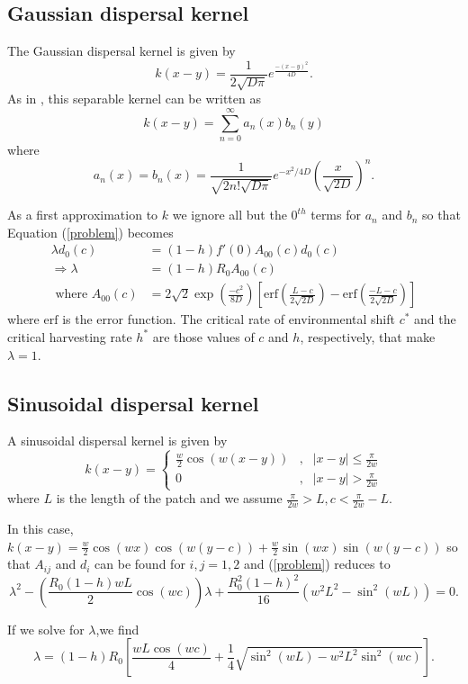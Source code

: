 \documentclass[12pt,english]{article}
\begin{document}
\subsection{Gaussian dispersal kernel \label{gausapp}}
The Gaussian dispersal kernel is given by
$$k(x-y)=\frac{1}{2\sqrt{D\pi}}e^{\frac{-(x-y)^2}{4D}}.$$
As in \citep{Latore:1998fk}, this separable kernel can be written as
$$k(x-y)=\sum_{n=0}^\infty a_n(x)b_n(y)$$
where
$$a_n(x)=b_n(x)=\frac{1}{\sqrt{2n!\sqrt{D\pi}}}e^{-x^2/4D}\left(\frac{x}{\sqrt{2D}}\right)^n.$$

As a first approximation to $k$ we ignore all but the $0^{th}$ terms for $a_n$ and $b_n$ so that Equation (\ref{problem}) becomes
\begin{align*}
\lambda d_0(c)&=(1-h)f'(0)A_{00}(c)d_0(c)
\\ \Rightarrow \lambda&=(1-h)R_0A_{00}(c)
\\\text{ where } A_{00}(c)&=2\sqrt{2}\exp\left(\frac{-c^2}{8D}\right)\left[\text{erf}\left(\frac{L-c}{2\sqrt{2D}}\right)-\text{erf}\left(\frac{-L-c}{2\sqrt{2D}}\right)\right]
\end{align*}
where $\text{erf}$ is the error function.  The critical rate of environmental shift $c^*$ and the critical harvesting rate $h^*$ are those values of $c$ and $h$, respectively, that make $\lambda=1$.

\subsection{Sinusoidal dispersal kernel \label{sinapp}}
A sinusoidal dispersal kernel is given by 
$$k(x-y)=\left\{\begin{array}{ccccc}
\frac{w}{2}\cos(w(x-y)) & , & |x-y|\leq\frac{\pi}{2w}
\\ 0 & , & |x-y|>\frac{\pi}{2w}
\end{array}\right.
$$
where $L$ is the length of the patch and we assume $\frac{\pi}{2w}>L,c<\frac{\pi}{2w}-L$.

In this case, $k(x-y)=\frac{w}{2}\cos(wx)\cos(w(y-c))+\frac{w}{2}\sin(wx)\sin(w(y-c))$ so that $A_{ij}$ and $d_i$ can be found for $i,j=1,2$ and (\ref{problem}) reduces to 
$$\lambda^2-\left(\frac{R_0(1-h)wL}{2}\cos(wc)\right)\lambda+\frac{R_0^2(1-h)^2}{16}\left(w^2L^2-\sin^2(wL)\right)=0.$$

If we solve for $\lambda$,we find
\begin{equation*} \lambda=(1-h)R_0\left[\frac{wL\cos(wc)}{4}+\frac{1}{4}\sqrt{\sin^2(wL)-w^2L^2\sin^2(wc)}\right]. \label{cosine} \end{equation*}
\end{document}
